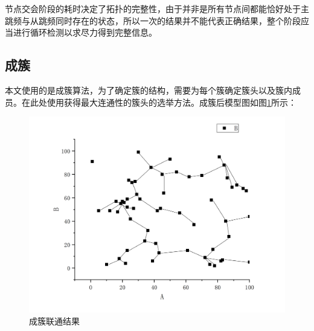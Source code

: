 \documentclass[a4paper,AutoFakeBold,oneside,12pt]{book}
\begin{document}
  节点交会阶段的耗时决定了拓扑的完整性，由于并非是所有节点间都能恰好处于主跳频与从跳频同时存在的状态，所以一次的结果并不能代表正确结果，整个阶段应当进行循环检测以求尽力得到完整信息。
\subsection{成簇}
  本文使用的是成簇算法，为了确定簇的结构，需要为每个簇确定簇头以及簇内成员。在此处使用获得最大连通性的簇头的选举方法。成簇后模型图如图\ref{liantong}所示：
\begin{figure}[htbp]
\centering %
\includegraphics[scale=0.3]{pictures/liantong.png} 
\caption{成簇联通结果} %
\label{liantong}
\end{figure}
  
\end{document}
